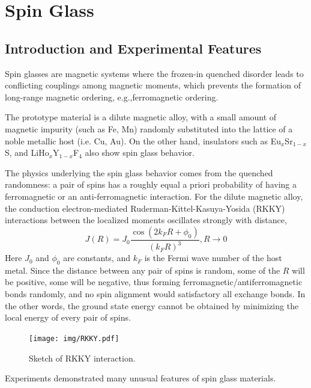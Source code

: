 \chapter{Spin Glass}
\label{chap:SGintro}
\section{Introduction and Experimental Features}
\label{sec:sg_intro}
Spin glasses \cite{Binder-Young-1986} are magnetic systems where the frozen-in quenched  
disorder leads to conflicting couplings among magnetic moments, which prevents the formation 
of long-range magnetic ordering, e.g.,ferromagnetic ordering.

The prototype material is a dilute magnetic alloy, with a small amount of 
magnetic impurity (such as Fe, Mn) randomly substituted into the lattice of a 
noble metallic host (i.e. Cu, Au). On the other hand, insulators such as 
Eu$_x$Sr$_{1-x}$S, and LiHo$_{x}$Y$_{1-x}$F$_{4}$ also show spin glass behavior.
 
The physics underlying the spin glass behavior comes from the quenched 
randomness: a pair of spins has a roughly equal a priori probability of having
a ferromagnetic or an anti-ferromagnetic interaction. For the dilute magnetic 
alloy, the conduction electron-mediated 
Ruderman-Kittel-Kasuya-Yosida (RKKY) interactions between the localized moments
 oscillates strongly with distance, 
 \begin{equation}
   \label{eq:RKKY}
   J(R)=J_0\frac{\cos(2k_FR+\phi_0)}{(k_FR)^3}, R\rightarrow 0
 \end{equation}
Here $J_0$ and $\phi_0$ are constants, and $k_F$ is the Fermi wave number of the
host metal. Since the distance between any pair of spins is random, some of the $R$
will be positive, some will be negative,
thus forming ferromagnetic/antiferromagnetic bonds randomly, and no spin 
alignment would satisfactory all exchange bonds. In the other words, the 
ground state energy cannot be obtained by minimizing the local energy 
of every pair of spins.

\begin{figure}[!h]
  \label{fig:rkky}
  \centering
  \texttt{[image: img/RKKY.pdf]}
  \caption{Sketch of RKKY interaction.}
\end{figure}

Experiments demonstrated many unusual features of spin glass materials.

